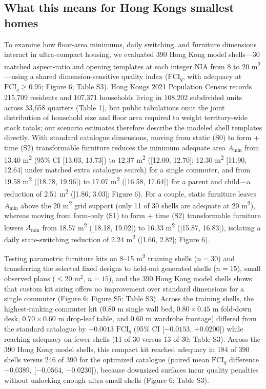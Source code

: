 \documentclass[12pt,letterpaper]{article}
\begin{document}
\subsection{What this means for Hong Kong\textquotesingle s smallest homes}\label{what-this-means-for-hong-kongs-smallest-homes}

To examine how floor-area minimums, daily switching, and furniture dimensions interact in ultra-compact housing, we evaluated 390 Hong Kong model shells---30 matched aspect-ratio and opening templates at each integer NIA from 8 to 20 m\textsuperscript{2}---using a shared dimension-sensitive quality index (\(\text{FCI}_q\), with adequacy at \(\text{FCI}_q \ge 0.95\); Figure 6; Table S3). Hong Kong\textquotesingle s 2021 Population Census records 215,709 residents and 107,371 households living in 108,202 subdivided units across 33,658 quarters (Table 1), but public tabulations omit the joint distribution of household size and floor area required to weight territory-wide stock totals; our scenario estimates therefore describe the modeled shell templates directly. With standard catalogue dimensions, moving from static (S0) to form + time (S2) transformable furniture reduces the minimum adequate area \(A_{\min}\) from 13.40 m\textsuperscript{2} (95\% CI {[}13.03, 13.73{]}) to 12.37 m\textsuperscript{2} ({[}12.00, 12.70{]}; 12.30 m\textsuperscript{2} {[}11.90, 12.64{]} under matched extra catalogue search) for a single commuter, and from 19.58 m\textsuperscript{2} ({[}18.78, 19.96{]}) to 17.07 m\textsuperscript{2} ({[}16.58, 17.64{]}) for a parent and child---a reduction of 2.51 m\textsuperscript{2} ({[}1.86, 3.03{]}; Figure 6). For a couple, static furniture leaves \(A_{\min}\) above the 20 m\textsuperscript{2} grid support (only 11 of 30 shells are adequate at 20 m\textsuperscript{2}), whereas moving from form-only (S1) to form + time (S2) transformable furniture lowers \(A_{\min}\) from 18.57 m\textsuperscript{2} ({[}18.18, 19.02{]}) to 16.33 m\textsuperscript{2} ({[}15.87, 16.83{]}), isolating a daily state-switching reduction of 2.24 m\textsuperscript{2} ({[}1.66, 2.82{]}; Figure 6).

Testing parametric furniture kits on 8--15 m\textsuperscript{2} training shells (\(n = 30\)) and transferring the selected fixed designs to held-out generated shells (\(n = 15\)), small observed plans (\(\le 20\text{ m}^2\), \(n = 15\)), and the 390 Hong Kong model shells shows that custom kit sizing offers no improvement over standard dimensions for a single commuter (Figure 6; Figure S5; Table S3). Across the training shells, the highest-ranking commuter kit (0.80 m single wall bed, \(0.80 \times 0.45\text{ m}\) fold-down desk, \(0.70 \times 0.60\text{ m}\) drop-leaf table, and 0.60 m wardrobe frontage) differed from the standard catalogue by \(+0.0013\) \(\text{FCI}_q\) (95\% CI {[}\(-0.0153\), \(+0.0200\){]}) while reaching adequacy on fewer shells (11 of 30 versus 13 of 30; Table S3). Across the 390 Hong Kong model shells, this compact kit reached adequacy in 184 of 390 shells versus 246 of 390 for the optimized catalogue (paired mean \(\text{FCI}_q\) difference \(-0.0389\), {[}\(-0.0564\), \(-0.0230\){]}), because downsized surfaces incur quality penalties without unlocking enough ultra-small shells (Figure 6; Table S3).
\end{document}
